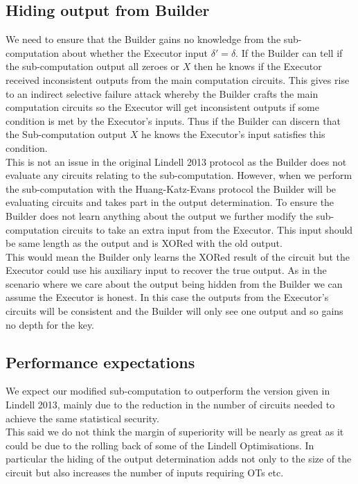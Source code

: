 \documentclass[ %
                    author={Nicholas Tutte},
                supervisor={Prof. Nigel Smart},
                    degree={MEng},
                     title={Secure Two Party Computation},
                  subtitle={A practical comparison of recent protocols},
                      type={Research - GG1K},
                      year={2015} ]{dissertation}
\begin{document}
			\subsection{Hiding output from Builder}
				We need to ensure that the Builder gains no knowledge from the sub-computation about whether the Executor input $\delta' = \delta$. If the Builder can tell if the sub-computation output all zeroes or $X$ then he knows if the Executor received inconsistent outputs from the main computation circuits. This gives rise to an indirect selective failure attack whereby the Builder crafts the main computation circuits so the Executor will get inconsistent outputs if some condition is met by the Executor's inputs. Thus if the Builder can discern that the Sub-computation output $X$ he knows the Executor's input satisfies this condition.\\

				This is not an issue in the original Lindell 2013 protocol as the Builder does not evaluate any circuits relating to the sub-computation. However, when we perform the sub-computation with the Huang-Katz-Evans protocol the Builder will be evaluating circuits and takes part in the output determination. To ensure the Builder does not learn anything about the output we further modify the sub-computation circuits to take an extra input from the Executor. This input should be same length as the output and is XORed with the old output.\\

				This would mean the Builder only learns the XORed result of the circuit but the Executor could use his auxiliary input to recover the true output. As in the scenario where we care about the output being hidden from the Builder we can assume the Executor is honest. In this case the outputs from the Executor's circuits will be consistent and the Builder will only see one output and so gains no depth for the key.\\

			\subsection{Performance expectations}

				We expect our modified sub-computation to outperform the version given in Lindell 2013, mainly due to the reduction in the number of circuits needed to achieve the same statistical security.\\

				This said we do not think the margin of superiority will be nearly as great as it could be due to the rolling back of some of the Lindell Optimisations. In particular the hiding of the output determination adds not only to the size of the circuit but also increases the number of inputs requiring OTs etc.\\
\end{document}
